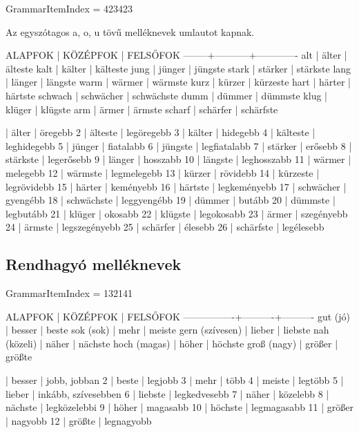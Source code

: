 \documentclass{article}
\newenvironment{desc}{\verbatim}{\endverbatim}
\newenvironment{exmp}{\verbatim}{\endverbatim}
\begin{document}
GrammarItemIndex = 423423

\begin{desc}
Az egyszótagos a, o, u tövű melléknevek umlautot kapnak.

ALAPFOK | KÖZÉPFOK  | FELSŐFOK
--------+-----------+-------------
alt     | älter     | älteste
kalt    | kälter    | kälteste
jung    | jünger    | jüngste
stark   | stärker   | stärkste
lang    | länger    | längste
warm    | wärmer    | wärmste
kurz    | kürzer    | kürzeste
hart    | härter    | härtste
schwach | schwächer | schwächste
dumm    | dümmer    | dümmste
klug    | klüger    | klügste
arm     | ärmer     | ärmste
scharf  | schärfer  | schärfste
\end{desc}

\begin{exmp}
1 | älter | öregebb
2 | älteste | legöregebb
3 | kälter | hidegebb
4 | kälteste | leghidegebb
5 | jünger | fiatalabb
6 | jüngste | legfiatalabb
7 | stärker | erősebb
8 | stärkste | legerősebb
9 | länger | hosszabb
10 | längste | leghosszabb
11 | wärmer | melegebb
12 | wärmste | legmelegebb
13 | kürzer | rövidebb
14 | kürzeste | legrövidebb
15 | härter | keményebb
16 | härtste | legkeményebb
17 | schwächer | gyengébb
18 | schwächste | leggyengébb
19 | dümmer | butább
20 | dümmste | legbutább
21 | klüger | okosabb
22 | klügste | legokosabb
23 | ärmer | szegényebb
24 | ärmste | legszegényebb
25 | schärfer | élesebb
26 | schärfste | legélesebb
\end{exmp}

\subsection{Rendhagyó melléknevek}

GrammarItemIndex = 132141

\begin{desc}
ALAPFOK         | KÖZÉPFOK | FELSŐFOK
----------------+----------+----------
gut (jó)        | besser   | beste
sok (sok)       | mehr     | meiste
gern (szívesen) | lieber   | liebste
nah (közeli)    | näher    | nächste
hoch (magas)    | höher    | höchste
groß (nagy)     | größer   | größte
\end{desc}

\begin{exmp}
1 | besser | jobb, jobban
2 | beste | legjobb
3 | mehr | több
4 | meiste | legtöbb
5 | lieber | inkább, szívesebben
6 | liebste | legkedvesebb
7 | näher | közelebb
8 | nächste | legközelebbi
9 | höher | magasabb
10 | höchste | legmagasabb
11 | größer | nagyobb
12 | größte | legnagyobb
\end{exmp}
\end{document}
